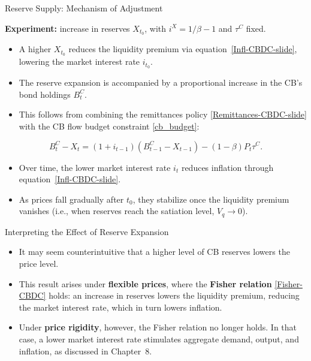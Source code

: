 \documentclass[11pt,aspectratio=169]{beamer}
\begin{document}
\begin{frame}{Reserve Supply: Mechanism of Adjustment}
\small

\textbf{Experiment:} increase in reserves $X_{t_0}$, with $i^X = 1/\beta - 1$ and $\tau^C$ fixed.

\begin{itemize}
    \item A higher $X_{t_0}$ reduces the liquidity premium via 
          equation~\eqref{Infl-CBDC-slide}, lowering the market interest rate $i_{t_0}$.
    \item The reserve expansion is accompanied by a proportional increase in the
          CB’s bond holdings $B_t^C$.
    \item This follows from combining the remittances policy 
          \eqref{Remittances-CBDC-slide} with the CB flow budget constraint 
          \eqref{cb_budget}:
\end{itemize}

\begin{equation} \label{Flow-CBDC-slide}
B_t^C - X_t
= (1+i_{t-1})(B_{t-1}^C - X_{t-1})
  - (1-\beta)P_t \tau^C.
\end{equation}

\begin{itemize}
    \item Over time, the lower market interest rate $i_t$ reduces inflation through
          equation~\eqref{Infl-CBDC-slide}.
    \item As prices fall gradually after $t_0$, they stabilize once the liquidity premium vanishes
          (i.e., when reserves reach the satiation level, $V_q \to 0$).
\end{itemize}

\end{frame}


\begin{frame}{Interpreting the Effect of Reserve Expansion}
\small

\begin{itemize}
    \item It may seem counterintuitive that a higher level of CB reserves lowers the price level.
    \vspace{0.8em}

    \item This result arises under \textbf{flexible prices}, where the \textbf{Fisher relation} \eqref{Fisher-CBDC} holds:  
    an increase in reserves lowers the liquidity premium, reducing the market interest rate, which in turn lowers inflation.
    \vspace{0.8em}

    \item Under \textbf{price rigidity}, however, the Fisher relation no longer holds.  
    In that case, a lower market interest rate stimulates aggregate demand, output, and inflation, as discussed in Chapter~8.
\end{itemize}

\end{frame}
\end{document}
